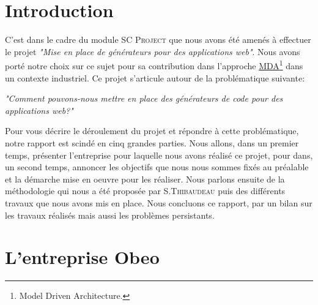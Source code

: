 \chapter*{Introduction}\label{chap:Intro}
C'est dans le cadre du module \textsc{SC Project} que nous avons été amenés à effectuer le projet \textit{"Mise en place de générateurs pour des applications web"}. Nous avons porté notre choix sur ce sujet pour sa contribution dans l'approche \href{http://fr.wikipedia.org/wiki/Model_driven_architecture}{MDA}\footnote{Model Driven Architecture.} dans un contexte industriel. 
Ce projet s'articule autour de la problématique suivante:
\begin {center}
\textit{"Comment pouvons-nous mettre en place des générateurs de code pour des applications web?"}
\end{center}
Pour vous décrire le déroulement du projet et répondre à cette problématique, notre rapport est scindé en cinq grandes parties. Nous allons, dans un premier temps, présenter l'entreprise \kwobeo{} pour laquelle nous avons réalisé ce projet, pour dans, un second temps, annoncer les objectifs que nous nous sommes fixés au préalable et la démarche mise en oeuvre pour les réaliser. Nous parlons ensuite de la méthodologie qui nous a été proposée par S.\textsc{Thibaudeau} puis des différents travaux que nous avons mis en place. Nous concluons ce rapport, par un bilan sur les travaux réalisés mais aussi les problèmes persistants.


\chapter{L'entreprise Obeo}
